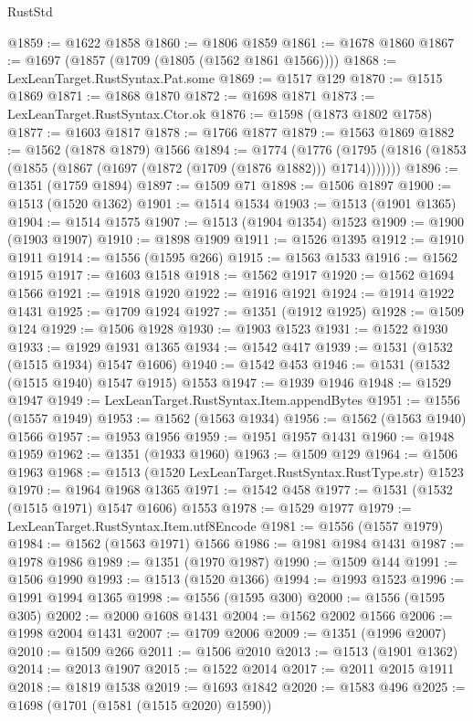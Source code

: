 \begin{lexlean}{RustStd}
\begin{coremodule}
@1859 := @1622 @1858
@1860 := @1806 @1859
@1861 := @1678 @1860
@1867 := @1697 (@1857 (@1709 (@1805 (@1562 @1861 @1566))))
@1868 := LexLeanTarget.RustSyntax.Pat.some
@1869 := @1517 @129
@1870 := @1515 @1869
@1871 := @1868 @1870
@1872 := @1698 @1871
@1873 := LexLeanTarget.RustSyntax.Ctor.ok
@1876 := @1598 (@1873 @1802 @1758)
@1877 := @1603 @1817
@1878 := @1766 @1877
@1879 := @1563 @1869
@1882 := @1562 (@1878 @1879) @1566
@1894 := @1774
    (@1776 (@1795 (@1816 (@1853 (@1855 (@1867 (@1697 (@1872 (@1709 (@1876 @1882))) @1714)))))))
@1896 := @1351 (@1759 @1894)
@1897 := @1509 @71
@1898 := @1506 @1897
@1900 := @1513 (@1520 @1362)
@1901 := @1514 @1534
@1903 := @1513 (@1901 @1365)
@1904 := @1514 @1575
@1907 := @1513 (@1904 @1354) @1523
@1909 := @1900 (@1903 @1907)
@1910 := @1898 @1909
@1911 := @1526 @1395
@1912 := @1910 @1911
@1914 := @1556 (@1595 @266)
@1915 := @1563 @1533
@1916 := @1562 @1915
@1917 := @1603 @1518
@1918 := @1562 @1917
@1920 := @1562 @1694 @1566
@1921 := @1918 @1920
@1922 := @1916 @1921
@1924 := @1914 @1922 @1431
@1925 := @1709 @1924
@1927 := @1351 (@1912 @1925)
@1928 := @1509 @124
@1929 := @1506 @1928
@1930 := @1903 @1523
@1931 := @1522 @1930
@1933 := @1929 @1931 @1365
@1934 := @1542 @417
@1939 := @1531 (@1532 (@1515 @1934) @1547 @1606)
@1940 := @1542 @453
@1946 := @1531 (@1532 (@1515 @1940) @1547 @1915) @1553
@1947 := @1939 @1946
@1948 := @1529 @1947
@1949 := LexLeanTarget.RustSyntax.Item.appendBytes
@1951 := @1556 (@1557 @1949)
@1953 := @1562 (@1563 @1934)
@1956 := @1562 (@1563 @1940) @1566
@1957 := @1953 @1956
@1959 := @1951 @1957 @1431
@1960 := @1948 @1959
@1962 := @1351 (@1933 @1960)
@1963 := @1509 @129
@1964 := @1506 @1963
@1968 := @1513 (@1520 LexLeanTarget.RustSyntax.RustType.str) @1523
@1970 := @1964 @1968 @1365
@1971 := @1542 @458
@1977 := @1531 (@1532 (@1515 @1971) @1547 @1606) @1553
@1978 := @1529 @1977
@1979 := LexLeanTarget.RustSyntax.Item.utf8Encode
@1981 := @1556 (@1557 @1979)
@1984 := @1562 (@1563 @1971) @1566
@1986 := @1981 @1984 @1431
@1987 := @1978 @1986
@1989 := @1351 (@1970 @1987)
@1990 := @1509 @144
@1991 := @1506 @1990
@1993 := @1513 (@1520 @1366)
@1994 := @1993 @1523
@1996 := @1991 @1994 @1365
@1998 := @1556 (@1595 @300)
@2000 := @1556 (@1595 @305)
@2002 := @2000 @1608 @1431
@2004 := @1562 @2002 @1566
@2006 := @1998 @2004 @1431
@2007 := @1709 @2006
@2009 := @1351 (@1996 @2007)
@2010 := @1509 @266
@2011 := @1506 @2010
@2013 := @1513 (@1901 @1362)
@2014 := @2013 @1907
@2015 := @1522 @2014
@2017 := @2011 @2015 @1911
@2018 := @1819 @1538
@2019 := @1693 @1842
@2020 := @1583 @496
@2025 := @1698 (@1701 (@1581 (@1515 @2020) @1590))

\end{coremodule}
\end{lexlean}

